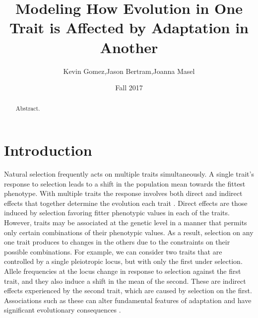 \documentclass[11pt,twocolumn]{article}
\title{Modeling How Evolution in One Trait is Affected by Adaptation in Another}
\date{Fall 2017}
\author{Kevin Gomez,Jason Bertram,Joanna Masel}
\begin{document}
\maketitle
\newpage

\begin{abstract}
Abstract.
\end{abstract}

\section*{Introduction}
\label{sec:introduction}

Natural selection frequently acts on multiple traits simultaneously. A single trait's response to selection leads to a shift in the population mean towards the fittest phenotype. With multiple traits the response involves both direct and indirect effects that together determine the evolution each trait \citep{lande1983measurement,Lovell2013,Wagner2011}. Direct effects are those induced by selection favoring fitter phenotypic values in each of the traits.  However, traits may be associated at the genetic level in a manner that permits only certain combinations of their phenotypic values.  As a result, selection on any one trait produces to changes in the others due to the constraints on their possible combinations. For example, we can consider two traits that are controlled by a single pleiotropic locus, but with only the first under selection. Allele frequencies at the locus change in response to selection against the first trait, and they also induce a shift in the mean of the second. These are indirect effects experienced by the second trait, which are caused by selection on the first.  Associations such as these can alter fundamental features of adaptation and have significant evolutionary consequences \citep{Felsenstein1979, Arnold2001, Arnold2008}.\par
% 
% 
% 
% 
% 
\end{document}
